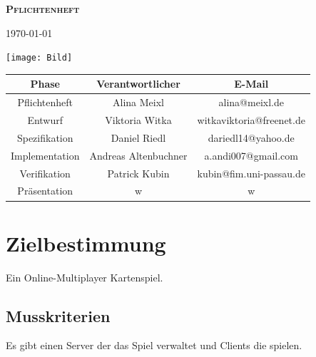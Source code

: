 \documentclass{article}
\begin{document}
\begin{titlepage}

\begin{center}
\textbf{\textsc{\LARGE Pflichtenheft}}

{\large \today}

\vspace{2cm}
\texttt{[image: Bild]}

\vspace{2cm}

\begin{tabular}{|c|c|c|}\hline
   Phase & Verantwortlicher & E-Mail \\ \hline\hline
   Pflichtenheft & Alina  Meixl  &  alina@meixl.de \\ \hline
   Entwurf & Viktoria Witka & witkaviktoria@freenet.de \\ \hline
   Spezifikation & Daniel Riedl & dariedl14@yahoo.de \\ \hline
   Implementation & Andreas Altenbuchner& a.andi007@gmail.com\\ \hline
   Verifikation &Patrick Kubin & kubin@fim.uni-passau.de\\ \hline
   Präsentation & w& w\\ \hline
 \end{tabular}

\end{center}

\end{titlepage}


\tableofcontents

\section{Zielbestimmung}
Ein Online-Multiplayer Kartenspiel.

\subsection{Musskriterien}
Es gibt einen \gls{Server} der das Spiel verwaltet und \glspl{Client} die spielen.
\end{document}
